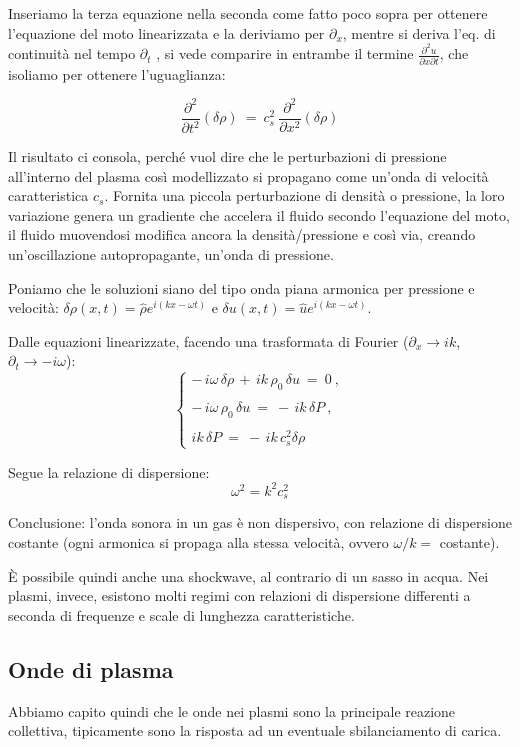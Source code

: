 Inseriamo la terza equazione nella seconda come fatto poco sopra per ottenere l'equazione del moto linearizzata e la deriviamo per $\partial_x$, mentre si deriva l'eq. di continuità nel tempo $\partial_t$ , si vede comparire in entrambe il termine $\displaystyle \frac{\partial^2 u}{\partial x \partial t}$, che isoliamo per ottenere l'uguaglianza:

\[ \frac{\partial^2}{\partial t^2} (\delta \rho)\ =\ c_s^2\ \frac{\partial^2}{\partial x^2} (\delta \rho)\]

Il risultato ci consola, perché vuol dire che le perturbazioni di pressione all'interno del plasma così modellizzato si propagano come un'onda di velocità caratteristica $c_s$. Fornita una piccola perturbazione di densità o pressione, la loro variazione genera un gradiente che accelera il fluido secondo l'equazione del moto, il fluido muovendosi modifica ancora la densità/pressione e così via, creando un'oscillazione autopropagante, un'onda di pressione.


Poniamo che le soluzioni siano del tipo onda piana armonica per pressione e velocità: $\delta \rho (x, t) = \hat \rho e^{i(kx-\omega t)}$ e $\delta u (x, t) = \hat u e^{i(kx-\omega t)}$.  

Dalle equazioni linearizzate, facendo una trasformata di Fourier ($\partial_x\rightarrow ik$, $\partial_t\rightarrow -i\omega$):
\[ \begin{cases}
	-\,i\omega\, \delta \rho\, +\, ik\, \rho_0\, \delta u\ =\ 0\ , \\ \\
	-\,i\omega\, \rho_0\, \delta u\ =\ -\,i k\, \delta P\ ,\\ \\
	ik\, \delta P\ =\ -\,ik\, c_s^2 \delta \rho
\end{cases} \]


Segue la relazione di dispersione:
\[
\boxed{\omega^2 = k^2 c_s^2}
\]

Conclusione: l'onda sonora in un gas è non dispersivo, con relazione di dispersione costante (ogni armonica si propaga alla stessa velocità, ovvero $\omega / k =$ costante). 

È possibile quindi anche una shockwave, al contrario di un sasso in acqua. Nei plasmi, invece, esistono molti regimi con relazioni di dispersione differenti a seconda di frequenze e scale di lunghezza caratteristiche.


%
%
\subsection{Onde di plasma} 
Abbiamo capito quindi che le onde nei plasmi sono la principale reazione collettiva, tipicamente sono la risposta ad un eventuale sbilanciamento di carica.

